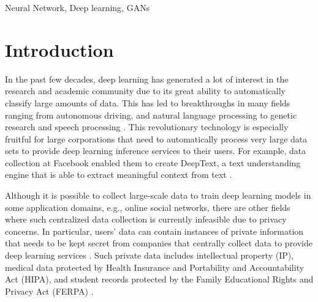 \documentclass[conference]{IEEEtran}
\begin{document}
\begin{IEEEkeywords}
Neural Network, Deep learning, GANs
\end{IEEEkeywords}

\section{Introduction}
In the past few decades, deep learning has generated a lot of interest in the research and academic community due to its great ability
to automatically classify large amounts of data. This has led to breakthroughs in many fields ranging
from autonomous driving, and natural language processing to genetic research and speech processing 
\cite{sun2014deep,young2018recent, al2017deep, danaee2017deep,hinton2012deep}.
This revolutionary technology is especially fruitful for large corporations that need to automatically process very large data sets to
provide deep learning inference services to their users. For example, data collection at Facebook enabled them to create DeepText, a
text understanding engine that is able to extract meaningful context from text \cite{abdulkader2016introducing}.

Although it is possible to collect large-scale data to train deep learning models in some application domains, e.g., online social
networks, there are other fields where such centralized data collection is currently infeasible due to privacy
concerns. In particular, users' data can contain instances of private information that needs to be kept secret from companies that 
centrally collect data to provide deep learning services \cite{chicurel2000databasing}. Such private data includes
intellectual property (IP), 
medical data protected by Health Insurance and Portability and Accountability Act (HIPA), and student records protected by the Family
Educational Rights and Privacy Act (FERPA) \cite{act1996health,blechner2002health,shultz2015your}. 
\end{document}
